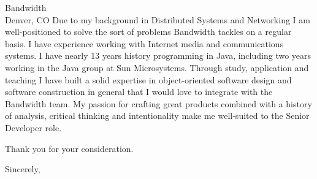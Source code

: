 \documentclass{letter}
\begin{document}
\begin{letter}{Bandwidth\\Denver, CO}
Due to my background in Distributed Systems and Networking I am
well-positioned to solve the sort of problems Bandwidth tackles on
a regular basis.  I have experience working with Internet media and
communications systems.  I have nearly 13 years history programming
in Java, including two years working in the Java group at Sun
Microsystems.  Through study, application and teaching I have built
a solid expertise in object-oriented software design and software
construction in general that I would love to integrate with the
Bandwidth team.  My passion for crafting great products combined
with a history of analysis, critical thinking and intentionality
make me well-suited to the Senior Developer role.

Thank you for your consideration.

\closing{Sincerely,}
\end{letter}
\end{document}

